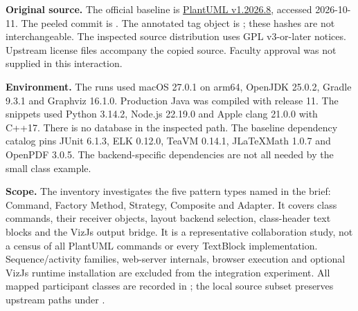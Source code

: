 \documentclass[11pt,a4paper]{article}
\begin{document}
\textbf{Original source.} The official baseline is
\href{https://github.com/plantuml/plantuml/tree/v1.2026.8}{PlantUML v1.2026.8}, accessed
2026-10-11. The peeled commit is
. The annotated tag object is
; these hashes are not interchangeable.
The inspected source distribution uses GPL v3-or-later notices. Upstream license
files accompany the copied source. Faculty approval was not supplied in this interaction.

\textbf{Environment.} The runs used macOS 27.0.1 on arm64, OpenJDK 25.0.2,
Gradle 9.3.1 and Graphviz 16.1.0. Production Java was compiled with release 11.
The snippets used Python 3.14.2, Node.js 22.19.0 and Apple clang 21.0.0 with C++17.
There is no database in the inspected path. The baseline dependency catalog pins
JUnit 6.1.3, ELK 0.12.0, TeaVM 0.14.1, JLaTeXMath 1.0.7 and OpenPDF 3.0.5.
The backend-specific dependencies are not all needed by the small class example.

\textbf{Scope.} The inventory investigates the five pattern types named in the
brief: Command, Factory Method, Strategy, Composite and Adapter. It covers
class commands, their receiver objects, layout backend selection, class-header
text blocks and the VizJs output bridge. It is a representative collaboration
study, not a census of all PlantUML commands or every TextBlock implementation.
Sequence/activity families, web-server internals, browser execution and optional
VizJs runtime installation are excluded from the integration experiment.
All mapped participant classes are recorded in ; the
local source subset preserves upstream paths under .
\end{document}
